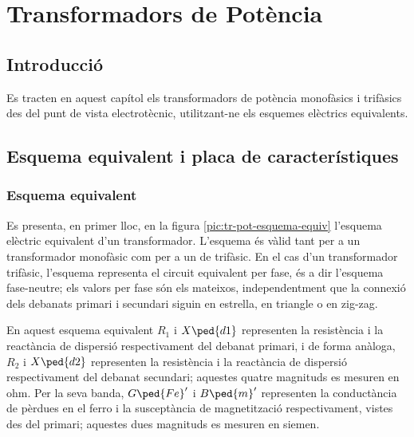 
\chapter{Transformadors de Potència}\label{sec:ch-trafos-pot}

\section{Introducció}
Es tracten en aquest capítol els transformadors de potència
monofàsics i trifàsics des del punt de vista electrotècnic, utilitzant-ne els esquemes elèctrics equivalents.

\section{Esquema equivalent i placa de característiques}

\subsection{Esquema equivalent}

Es presenta, en primer lloc, en la figura \vref{pic:tr-pot-esquema-equiv} l'esquema elèctric equivalent d'un transformador.
L'esquema és vàlid tant per a un transformador monofàsic com per a un de trifàsic. En el cas d'un transformador trifàsic, l'esquema representa el circuit equivalent per fase, és a dir l'esquema fase-neutre; els valors per fase són els mateixos, independentment que la connexió dels debanats primari i secundari siguin en estrella, en triangle o en zig-zag.

\begin{center}
    
    \label{pic:tr-pot-esquema-equiv}
\end{center}

En aquest esquema equivalent $R_1$ i $X\ped{d1}$ representen la resistència i la reactància de dispersió respectivament del debanat primari, i de forma anàloga, $R_2$ i $X\ped{d2}$ representen la resistència i la reactància de dispersió respectivament del debanat secundari; aquestes quatre magnituds es mesuren en ohm. Per la seva banda, $G\ped{Fe}'$ i $B\ped{m}'$ representen la conductància de pèrdues en el ferro i la susceptància de magnetització respectivament, vistes des del primari; aquestes dues magnituds es mesuren en siemen.

